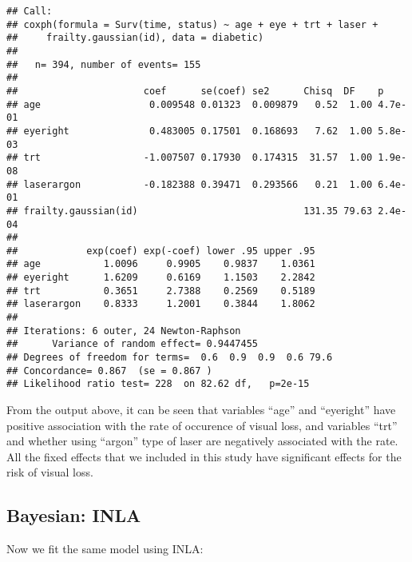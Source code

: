 \documentclass[]{article}
\newenvironment{Shaded}{\begin{snugshade}}{\end{snugshade}}
\newcommand{\DataTypeTok}[1]{\textcolor[rgb]{0.13,0.29,0.53}{#1}}
\newcommand{\DecValTok}[1]{\textcolor[rgb]{0.00,0.00,0.81}{#1}}
\newcommand{\KeywordTok}[1]{\textcolor[rgb]{0.13,0.29,0.53}{\textbf{#1}}}
\newcommand{\NormalTok}[1]{#1}
\newcommand{\OperatorTok}[1]{\textcolor[rgb]{0.81,0.36,0.00}{\textbf{#1}}}
\newcommand{\OtherTok}[1]{\textcolor[rgb]{0.56,0.35,0.01}{#1}}
\newcommand{\StringTok}[1]{\textcolor[rgb]{0.31,0.60,0.02}{#1}}
\begin{document}
\begin{verbatim}
## Call:
## coxph(formula = Surv(time, status) ~ age + eye + trt + laser + 
##     frailty.gaussian(id), data = diabetic)
## 
##   n= 394, number of events= 155 
## 
##                      coef      se(coef) se2      Chisq  DF    p      
## age                   0.009548 0.01323  0.009879   0.52  1.00 4.7e-01
## eyeright              0.483005 0.17501  0.168693   7.62  1.00 5.8e-03
## trt                  -1.007507 0.17930  0.174315  31.57  1.00 1.9e-08
## laserargon           -0.182388 0.39471  0.293566   0.21  1.00 6.4e-01
## frailty.gaussian(id)                             131.35 79.63 2.4e-04
## 
##            exp(coef) exp(-coef) lower .95 upper .95
## age           1.0096     0.9905    0.9837    1.0361
## eyeright      1.6209     0.6169    1.1503    2.2842
## trt           0.3651     2.7388    0.2569    0.5189
## laserargon    0.8333     1.2001    0.3844    1.8062
## 
## Iterations: 6 outer, 24 Newton-Raphson
##      Variance of random effect= 0.9447455 
## Degrees of freedom for terms=  0.6  0.9  0.9  0.6 79.6 
## Concordance= 0.867  (se = 0.867 )
## Likelihood ratio test= 228  on 82.62 df,   p=2e-15
\end{verbatim}

From the output above, it can be seen that variables ``age'' and
``eyeright'' have positive association with the rate of occurence of
visual loss, and variables ``trt'' and whether using ``argon'' type of
laser are negatively associated with the rate. All the fixed effects
that we included in this study have significant effects for the risk of
visual loss.

\hypertarget{bayesian-inla}{%
\subsection{Bayesian: INLA}\label{bayesian-inla}}

Now we fit the same model using INLA:

\begin{Shaded}
\end{Shaded}
\end{document}
